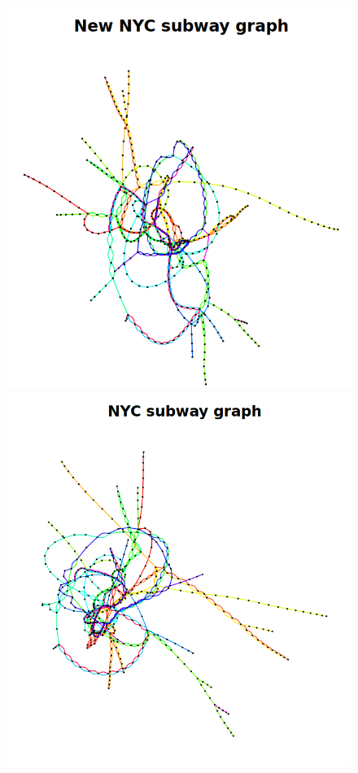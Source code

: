 \begin{figure}[!htb]
\begin{minipage}[b]{0.24\textwidth}
    \end{minipage}
    \hfill
    \begin{minipage}[b]{0.24\textwidth}
        \includegraphics[width=\textwidth]{images/CityGraph_New NYC.png}

    \end{minipage}
    \hfill
    \begin{minipage}[b]{0.24\textwidth}
        \includegraphics[width=\textwidth]{images/CityGraph_NYC.png}


\end{minipage}
\end{figure}
